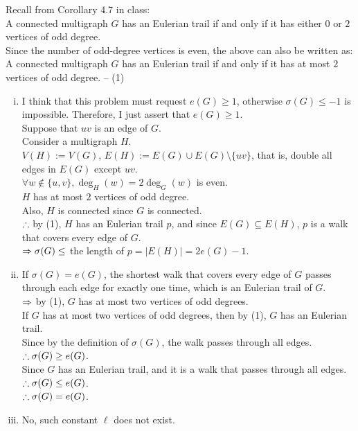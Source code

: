 \setcounter{pr}{2}
\begin{pr}
Recall from Corollary 4.7 in class:\\
A connected multigraph $G$ has an Eulerian trail if and only if it has either $0$ or $2$ vertices of odd degree.\\
Since the number of odd-degree vertices is even, the above can also be written as:\\
A connected multigraph $G$ has an Eulerian trail if and only if it has at most $2$ vertices of odd degree. -- (1)
\begin{enumerate}[(i)]
\item I think that this problem must request $e(G)\geq1$, otherwise $\sigma(G)\leq-1$ is impossible. Therefore, I just assert that $e(G)\geq1$.\\
Suppose that $uv$ is an edge of $G$.\\
Consider a multigraph $H$.\\
$V(H):=V(G)$, $E(H):=E(G)\cup E(G)\setminus\{uv\}$, that is, double all edges in $E(G)$ except $uv$.\\
$\forall w\notin\{u, v\}, \deg_H(w)=2\deg_G(w)$ is even.\\
$H$ has at most $2$ vertices of odd degree.\\
Also, $H$ is connected since $G$ is connected.\\
$\therefore$ by (1), $H$ has an Eulerian trail $p$, and since $E(G)\subseteq E(H)$, $p$ is a walk that covers every edge of $G$.\\
$\Rightarrow\sigma(G)\leq$ the length of $p=|E(H)|=2e(G)-1$.
\item If $\sigma(G)=e(G)$, the shortest walk that covers every edge of $G$ passes through each edge for exactly one time, which is an Eulerian trail of $G$.\\
$\Rightarrow$ by (1), $G$ has at most two vertices of odd degrees.\\
If $G$ has at most two vertices of odd degrees, then by (1), $G$ has an Eulerian trail.\\
Since by the definition of $\sigma(G)$, the walk passes through all edges.\\
$\therefore\sigma(G)\geq e(G)$.\\
Since $G$ has an Eulerian trail, and it is a walk that passes through all edges.\\
$\therefore\sigma(G)\leq e(G)$.\\
$\therefore\sigma(G)=e(G)$.
\item No, such constant $\ell$ does not exist.\\

\end{enumerate}
\end{pr}

